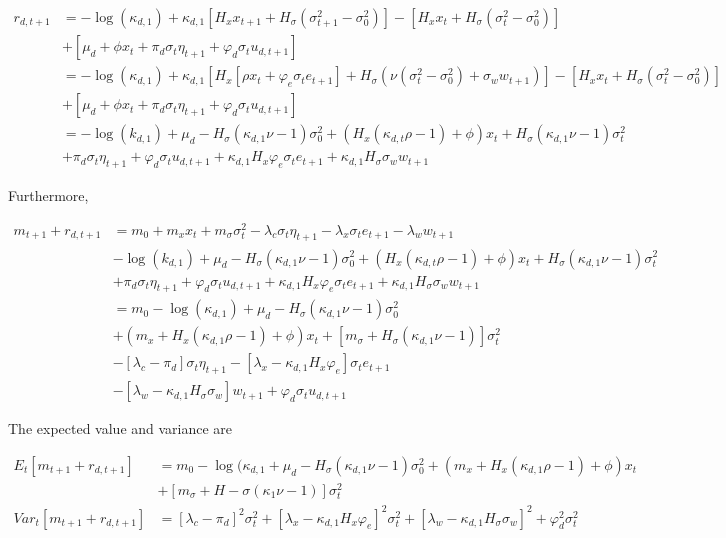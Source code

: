 \documentclass{article}
\begin{document}
\begin{enumerate}
\begin{align*}
r_{d,t+1} 
&= - \log(\kappa_{d,1}) + \kappa_{d,1} [H_x x_{t+1} + H_\sigma(\sigma_{t+1}^2 - \sigma_0^2)] - [H_x x_t + H_\sigma(\sigma_t^2 - \sigma_0^2)] \\
&+ [\mu_d + \phi x_t + \pi_d \sigma_t \eta_{t+1} + \varphi_d \sigma_t u_{d,t+1}]\\
&= - \log(\kappa_{d,1}) + \kappa_{d,1} [H_x [\rho x_t + \varphi_e \sigma_t e_{t+1}]+ H_\sigma(\nu(\sigma_t^2 - \sigma_0^2) + \sigma_w w_{t+1})] - [H_x x_t + H_\sigma(\sigma_t^2 - \sigma_0^2)] \\
&+ [\mu_d + \phi x_t + \pi_d \sigma_t \eta_{t+1} + \varphi_d \sigma_t u_{d,t+1}]\\
&= -\log(k_{d,1}) + \mu_d - H_\sigma (\kappa_{d,1} \nu - 1) \sigma_0^2 + (H_x(\kappa_{d,t} \rho - 1) + \phi) x_t + H_\sigma(\kappa_{d,1} \nu - 1) \sigma_t^2 \\
&+ \pi_d \sigma_t \eta_{t+1} + \varphi_d  \sigma_t u_{d,t+1} + \kappa_{d,1} H_x \varphi_e \sigma_t e_{t+1} + \kappa_{d,1} H_\sigma \sigma_w w_{t+1}
\end{align*}

\pagebreak

Furthermore,

\begin{align*}
m_{t+1} + r_{d,t+1} 
&= m_0 + m_x x_t + m_\sigma \sigma_t^2 - \lambda_c \sigma_t \eta_{t+1} - \lambda_x \sigma_t e_{t+1} - \lambda_w w_{t+1} \\
&-\log(k_{d,1}) + \mu_d - H_\sigma (\kappa_{d,1} \nu - 1) \sigma_0^2 + (H_x(\kappa_{d,t} \rho - 1) + \phi) x_t + H_\sigma(\kappa_{d,1} \nu - 1) \sigma_t^2 \\
&+ \pi_d \sigma_t \eta_{t+1} + \varphi_d  \sigma_t u_{d,t+1} + \kappa_{d,1} H_x \varphi_e \sigma_t e_{t+1} + \kappa_{d,1} H_\sigma \sigma_w w_{t+1} \\
&= m_0 - \log(\kappa_{d,1}) + \mu_d - H_\sigma(\kappa_{d,1}\nu - 1) \sigma_0^2 \\
&+ (m_x + H_x (\kappa_{d,1} \rho - 1) + \phi) x_t +[m_\sigma + H_\sigma(\kappa_{d,1} \nu - 1)] \sigma_t^2 \\
&- [\lambda_c - \pi_d]\sigma_t \eta_{t+1} - [\lambda_x - \kappa_{d,1} H_x \varphi_e] \sigma_t e_{t+1} \\
&- [\lambda_w - \kappa_{d,1} H_\sigma \sigma_w]w_{t+1} + \varphi_d \sigma_t u_{d,t+1}
\end{align*}

The expected value and variance are

\begin{align*}
E_t[m_{t+1} + r_{d,t+1}] &= m_0 - \log(\kappa_{d,1} + \mu_d - H_\sigma(\kappa_{d,1} \nu - 1) \sigma^2_0 + (m_x + H_x (\kappa_{d,1} \rho - 1) + \phi) x_t \\
&+ [m_\sigma + H-\sigma(\kappa_1 \nu - 1)] \sigma_t^2\\
Var_t[m_{t+1} + r_{d,t+1}] &= [\lambda_c - \pi_d]^2 \sigma_t^2 + [\lambda_x - \kappa_{d,1} H_x \varphi_e]^2 \sigma_t^2 + [\lambda_w - \kappa_{d,1} H_\sigma \sigma_w]^2 + \varphi_d^2 \sigma_t^2
\end{align*}



\end{enumerate}
\end{document}
